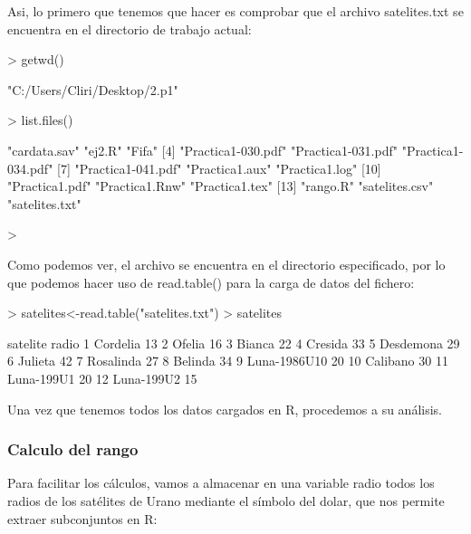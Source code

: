 \documentclass [a4paper] {article}
\begin{document}
Asi, lo primero que tenemos que hacer es comprobar que el archivo satelites.txt se encuentra en el directorio de trabajo actual:
\begin{Schunk}
\begin{Sinput}
> getwd()
\end{Sinput}
\begin{Soutput}
[1] "C:/Users/Cliri/Desktop/2.p1"
\end{Soutput}
\begin{Sinput}
> list.files()
\end{Sinput}
\begin{Soutput}
 [1] "cardata.sav"       "ej2.R"             "Fifa"             
 [4] "Practica1-030.pdf" "Practica1-031.pdf" "Practica1-034.pdf"
 [7] "Practica1-041.pdf" "Practica1.aux"     "Practica1.log"    
[10] "Practica1.pdf"     "Practica1.Rnw"     "Practica1.tex"    
[13] "rango.R"           "satelites.csv"     "satelites.txt"    
\end{Soutput}
\begin{Sinput}
> 
\end{Sinput}
\end{Schunk}
Como podemos ver, el archivo se encuentra en el directorio especificado, por lo que podemos hacer uso de read.table() para la carga de datos del fichero:
\begin{Schunk}
\begin{Sinput}
> satelites<-read.table("satelites.txt")
> satelites
\end{Sinput}
\begin{Soutput}
       satelite radio
1      Cordelia    13
2        Ofelia    16
3        Bianca    22
4       Cresida    33
5     Desdemona    29
6       Julieta    42
7     Rosalinda    27
8       Belinda    34
9  Luna-1986U10    20
10     Calibano    30
11   Luna-199U1    20
12   Luna-199U2    15
\end{Soutput}
\end{Schunk}

Una vez que tenemos todos los datos cargados en R, procedemos a su análisis.

\subsubsection{Calculo del rango}
Para facilitar los cálculos, vamos a almacenar en una variable radio todos los radios de los satélites de Urano mediante el símbolo del dolar,  
que nos permite extraer subconjuntos en R:
\end{document}
